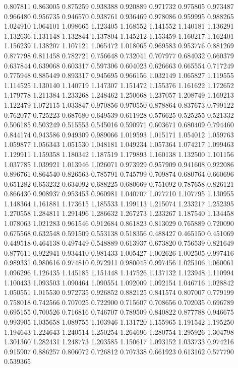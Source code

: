 0.807811
0.863005
0.875259
0.938388
0.920889
0.971732
0.975805
0.973487
0.966480
0.956735
0.946570
0.938761
0.936469
0.978086
0.959995
0.988265
1.024910
1.064101
1.098665
1.123405
1.168552
1.141552
1.140181
1.136291
1.132636
1.131148
1.132844
1.137804
1.145212
1.153459
1.160217
1.162401
1.156239
1.138207
1.107121
1.065472
1.018065
0.969583
0.953776
0.881269
0.877798
0.811458
0.782721
0.756648
0.732041
0.707977
0.684032
0.660379
0.637844
0.639068
0.603317
0.597306
0.604023
0.626663
0.665554
0.717249
0.775948
0.885449
0.893317
0.945695
0.966156
1.032149
1.065827
1.119555
1.114525
1.130140
1.140719
1.147307
1.151472
1.155376
1.161622
1.172652
1.179778
1.211384
1.233268
1.248462
1.250668
1.237057
1.208749
1.169213
1.122479
1.072115
1.033847
0.970856
0.970550
0.878864
0.837673
0.799122
0.762077
0.725223
0.687680
0.649539
0.611928
0.576625
0.525255
0.521332
0.506185
0.503249
0.515553
0.545016
0.590971
0.603671
0.680409
0.794460
0.844174
0.943586
0.949309
0.989066
1.019593
1.015171
1.054012
1.059763
1.059877
1.056343
1.051530
1.048181
1.049234
1.057364
1.074217
1.099463
1.129911
1.159358
1.180342
1.187519
1.179893
1.160138
1.132500
1.101156
1.037785
1.039921
1.013946
1.026071
0.973929
0.957909
0.941608
0.922086
0.896761
0.864540
0.826563
0.785791
0.745799
0.709874
0.680764
0.660696
0.651282
0.653232
0.634092
0.688225
0.680669
0.751092
0.787658
0.826121
0.866430
0.908937
0.953453
0.960981
1.040707
1.077710
1.107795
1.130955
1.148364
1.161881
1.173615
1.185533
1.199113
1.215074
1.233217
1.252395
1.270558
1.284811
1.291496
1.286632
1.267273
1.233267
1.187540
1.134458
1.078063
1.021283
0.961546
0.912684
0.861823
0.813029
0.765889
0.720090
0.675568
0.632548
0.591509
0.553138
0.518356
0.488427
0.465150
0.451069
0.449518
0.464138
0.497449
0.548889
0.613937
0.673820
0.756539
0.821649
0.877611
0.922941
0.934410
0.981433
1.005427
1.002626
1.002505
0.997416
0.989331
0.980616
0.974810
0.972911
0.980045
0.997456
1.025106
1.060061
1.096296
1.126435
1.145185
1.151448
1.147526
1.137132
1.123948
1.110994
1.100433
1.093503
1.090464
1.090554
1.092009
1.092154
1.046716
1.028842
1.050551
1.015530
0.972735
0.926852
0.882125
0.841574
0.807007
0.779199
0.758018
0.742566
0.707025
0.722900
0.715607
0.708656
0.702035
0.696789
0.695155
0.700526
0.716816
0.746707
0.789509
0.840822
0.877788
0.946675
0.993905
1.035658
1.089755
1.103946
1.131720
1.155965
1.191542
1.195250
1.194643
1.224643
1.240514
1.250254
1.264696
1.280754
1.295926
1.304798
1.301360
1.282431
1.248773
1.203585
1.150617
1.093152
1.033733
0.974216
0.915907
0.886257
0.806072
0.726812
0.707338
0.661923
0.613162
0.577790
0.539365
